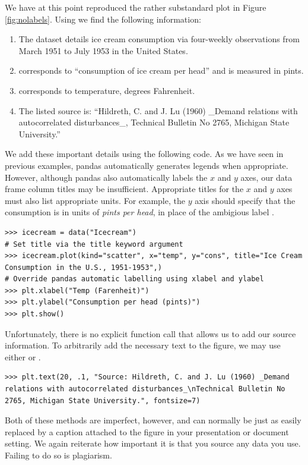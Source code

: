 We have at this point reproduced the rather substandard plot in Figure \ref{fig:nolabels}.
Using  we find the following information:
\begin{enumerate}
    \item The dataset details ice cream consumption via four-weekly observations from March 1951 to July 1953 in the United States.
    \item {} corresponds to ``consumption of ice cream per head'' and is measured in pints.
    \item {} corresponds to temperature, degrees Fahrenheit.
    \item The listed source is: ``Hildreth, C. and J. Lu (1960) \_Demand relations with autocorrelated disturbances\_, Technical Bulletin No 2765, Michigan State University.''
\end{enumerate}

We add these important details using the following code.
As we have seen in previous examples, pandas automatically generates legends when appropriate.
However, although pandas also automatically labels the $x$ and $y$ axes, our data frame column titles may be insufficient.
Appropriate titles for the $x$ and $y$ axes must also list appropriate units.
For example, the $y$ axis should specify that the consumption is in units of \emph{pints per head}, in place of the ambigious label .
\begin{lstlisting}
>>> icecream = data("Icecream")
# Set title via the title keyword argument
>>> icecream.plot(kind="scatter", x="temp", y="cons", title="Ice Cream Consumption in the U.S., 1951-1953",)
# Override pandas automatic labelling using xlabel and ylabel
>>> plt.xlabel("Temp (Farenheit)")
>>> plt.ylabel("Consumption per head (pints)")
>>> plt.show()
\end{lstlisting}

Unfortunately, there is no explicit function call that allows us to add our source information.
To arbitrarily add the necessary text to the figure, we may use either  or .
\begin{lstlisting}
>>> plt.text(20, .1, "Source: Hildreth, C. and J. Lu (1960) _Demand relations with autocorrelated disturbances_\nTechnical Bulletin No 2765, Michigan State University.", fontsize=7)
\end{lstlisting}
Both of these methods are imperfect, however, and can normally be just as easily replaced by a caption attached to the figure in your presentation or document setting.
We again reiterate how important it is that you source any data you use. Failing to do so is plagiarism.

